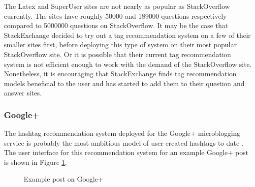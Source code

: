 \documentclass[man,floatsintext,donotrepeattitle]{apa6}
\begin{document}
The Latex and SuperUser sites are not nearly as popular as StackOverflow currently.
The sites have roughly \num{50000} and \num{189000} questions respectively compared to \num{5000000} questions on StackOverflow.
It may be the case that StackExchange decided to try out a tag recommendation system on a few of their smaller sites first, before deploying this type of system on their most popular StackOverflow site.
Or it is possible that their current tag recommendation system is not efficient enough to work with the demand of the StackOverflow site.
Nonetheless, it is encouraging that StackExchange finds tag recommendation models beneficial to the user and has started to add them to their question and answer sites. 

\subsubsection{Google+}

The hashtag recommendation system deployed for the Google+ microblogging service is probably the most ambitious model of user-created hashtags to date \parencite{GoogleKeynote2013}.
The user interface for this recommendation system for an example Google+ post is shown in Figure \ref{figGoogle+Hashtags}.

\begin{figure}[!htbp]
  \caption{Example post on Google+}
  \label{figGoogle+Hashtags}
\end{figure}
\end{document}
